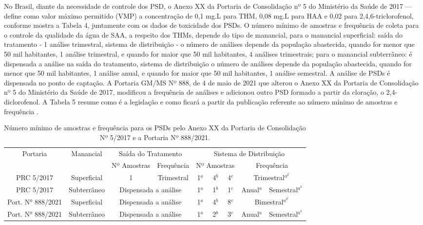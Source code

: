 \newpage
No Brasil, diante da necessidade de controle dos PSD, o Anexo XX da Portaria de Consolidação nº 5 do Ministério da Saúde de 2017 — define como valor máximo permitido (VMP) a concentração de 0,1 mg.L\- para THM, 0,08  mg.L\- para HAA e 0,02 para 2,4,6-triclorofenol, conforme mostra a Tabela 4, juntamente com os dados de toxicidade dos PSDs. O número mínimo de amostras e frequência de coleta para o controle da qualidade da água de SAA, a respeito dos THMs, depende do tipo de manancial, para o manancial superficial: saída do tratamento - 1 análise trimestral, sistema de distribuição - o número de análises depende da população abastecida, quando for menor que 50 mil habitantes, 1 análise trimestral, e quando for maior que 50 mil habitantes, 4 análises trimestrais; para o manancial subterrâneo: é dispensada a análise na saída do tratamento, sistema de distribuição o número de análises depende da população abastecida, quando for menor que 50 mil habitantes, 1 análise anual, e quando for maior que 50 mil habitantes, 1 análise semestral. A análise de PSDs é dispensada no ponto de captação. A Portaria GM/MS Nº 888, de 4 de maio de 2021 que alterou o Anexo XX da Portaria de Consolidação nº 5 do Ministério da Saúde de 2017, modificou a frequência de análises e adicionou outro PSD formado a partir da cloração, o 2,4-diclorofenol. A Tabela 5 resume como é a legislação e como ficará a partir da publicação referente ao número mínimo de amostras e frequência .


\begin{table}[!htb]

\small
\centering
\caption{Número mínimo de amostras e frequência para os PSDs pelo Anexo XX da Portaria de Consolidação Nº 5/2017 e a Portaria Nº 888/2021.} 
\begin{tabular}{cccccccccl}
\toprule
\multirow{2}{*}{Portaria} & \multirow{2}{*}{Manancial} & \multicolumn{2}{c}{Saída do Tratamento} & \multicolumn{6}{c}{Sistema de Distribuição} \\
 &  & Nº Amostras & Frequência & \multicolumn{3}{c}{Nº Amostras} & \multicolumn{3}{c}{Frequência} \\\midrule
PRC 5/2017 & Superficial & 1 & Trimestral & 1$^a$ & 4$^b$ & 4$^c$ & \multicolumn{3}{c}{Trimestral$^a^b^c$} \\
PRC 5/2017 & Subterrâneo & \multicolumn{2}{c}{Dispensada a análise} & 1$^a$ & 1$^b$ & 1$^c$ & Anual$^a$ & \multicolumn{2}{c}{Semestral$^a^b$} \\\hline
Port. N° 888/2021 & Superficial & \multicolumn{2}{c}{Dispensada a análise} & 1$^a$ & 4$^b$ & 8$^c$ & \multicolumn{3}{c}{Bimestral$^a^b^c$} \\
Port. N° 888/2021 & Subterrâneo & \multicolumn{2}{c}{Dispensada a análise} & 1$^a$ & 2$^b$ & 3$^c$ & Anual$^a$ & \multicolumn{2}{c}{Semestral$^a^b$}\\\bottomrule
\end{tabular}

\end{table}


